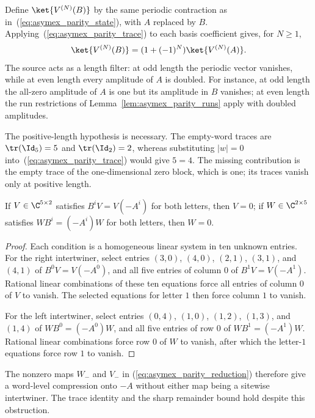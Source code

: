 Define $\ket{V^{(N)}(B)}$ by the same periodic contraction as
in~(\ref{eq:asymex_parity_state}), with $A$ replaced by $B$.
Applying~(\ref{eq:asymex_parity_trace}) to each basis coefficient
gives, for $N\geq1$,
\begin{align}
    \ket{V^{(N)}(B)}
    =(1+(-1)^N)\ket{V^{(N)}(A)}.
    \label{eq:asymex_parity_length}
\end{align}
The source acts as a length filter: at odd length the periodic vector
vanishes, while at even length every amplitude of $A$ is doubled.
For instance, at odd length the all-zero amplitude of $A$ is one but its
amplitude in $B$ vanishes; at even length the run restrictions of
Lemma~\ref{lem:asymex_parity_runs} apply with doubled amplitudes.

The positive-length hypothesis is necessary. The empty-word
traces are $\tr(\Id_5)=5$ and $\tr(\Id_2)=2$, whereas substituting
$|w|=0$ into~(\ref{eq:asymex_parity_trace}) would give $5=4$.
The missing contribution is the empty trace of the
one-dimensional zero block, which is one; its traces vanish only
at positive length.

\begin{theorem}
    \label{thm:asymex_parity_no_intertwiner}
    \leanok
    If $V\in\C^{5\times2}$ satisfies $B^iV=V(-A^i)$ for both letters, then
    $V=0$; if $W\in\C^{2\times5}$ satisfies $WB^i=(-A^i)W$ for both
    letters, then $W=0$.
\end{theorem}

\begin{proof}
    \leanok
    Each condition is a homogeneous linear system in ten unknown
    entries. For the right intertwiner, select entries
    $(3,0)$, $(4,0)$, $(2,1)$, $(3,1)$, and $(4,1)$ of
    $B^0V=V(-A^0)$, and all five entries of column $0$ of
    $B^1V=V(-A^1)$. Rational linear combinations of these ten
    equations force all entries of column $0$ of $V$ to vanish.
    The selected equations for letter $1$ then force column $1$
    to vanish.

    For the left intertwiner, select entries $(0,4)$, $(1,0)$,
    $(1,2)$, $(1,3)$, and $(1,4)$ of $WB^0=(-A^0)W$, and all
    five entries of row $0$ of $WB^1=(-A^1)W$. Rational linear
    combinations force row $0$ of $W$ to vanish, after which the
    letter-$1$ equations force row $1$ to vanish.
\end{proof}

The nonzero maps $W_-$ and $V_-$ in
(\ref{eq:asymex_parity_reduction}) therefore give a word-level
compression onto $-A$ without either map being a sitewise
intertwiner. The trace identity and the sharp remainder bound
hold despite this obstruction.
